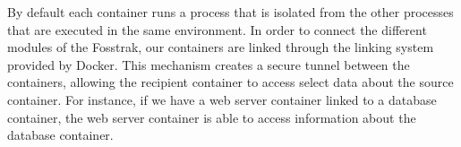 By default each container runs a process that is isolated from the other processes that are executed
in the same environment. In order to connect the different modules of the Fosstrak, our containers are
linked through the linking system provided by Docker. This mechanism creates a secure tunnel between the
containers, allowing the recipient container to access select data about the source container. For instance,
if we have a web server container linked to a database container, the web server container is able to access
information about the database container.\\
